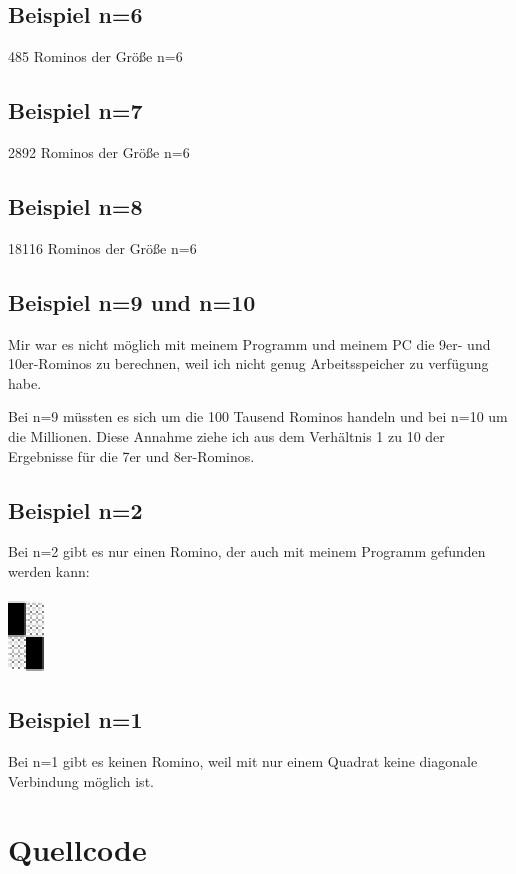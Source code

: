 \documentclass[a4paper,10pt]{scrartcl}
\begin{document}
\subsection{Beispiel n=6}
485 Rominos der Größe n=6

\subsection{Beispiel n=7}
2892 Rominos der Größe n=6

\subsection{Beispiel n=8}
18116 Rominos der Größe n=6

\subsection{Beispiel n=9 und n=10}
Mir war es nicht möglich mit meinem Programm und meinem PC die 9er- und 10er-Rominos zu berechnen, weil ich nicht genug Arbeitsspeicher zu verfügung habe.

Bei n=9 müssten es sich um die 100 Tausend Rominos handeln und bei n=10 um die Millionen. Diese Annahme ziehe ich aus dem Verhältnis 1 zu 10 der Ergebnisse für die 7er und 8er-Rominos.

\subsection{Beispiel n=2}
Bei n=2 gibt es nur einen Romino, der auch mit meinem Programm gefunden werden kann: \\\\
\includegraphics{2.jpg}

\subsection{Beispiel n=1}
Bei n=1 gibt es keinen Romino, weil mit nur einem Quadrat keine diagonale Verbindung möglich ist.

\section{Quellcode}
\lstset{numbers=left}

\end{document}
